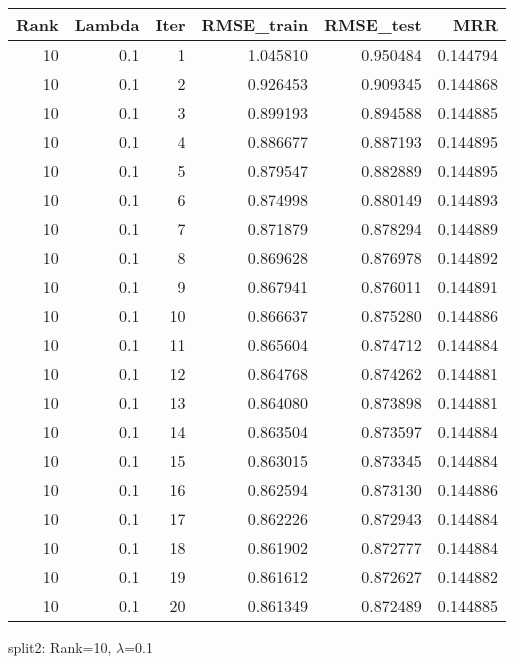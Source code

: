 \begin{tabular}{rrrrrr}
\toprule
 Rank &  Lambda &  Iter &  RMSE\_train &  RMSE\_test &       MRR \\
\midrule
   10 &     0.1 &     1 &    1.045810 &   0.950484 &  0.144794 \\
   10 &     0.1 &     2 &    0.926453 &   0.909345 &  0.144868 \\
   10 &     0.1 &     3 &    0.899193 &   0.894588 &  0.144885 \\
   10 &     0.1 &     4 &    0.886677 &   0.887193 &  0.144895 \\
   10 &     0.1 &     5 &    0.879547 &   0.882889 &  0.144895 \\
   10 &     0.1 &     6 &    0.874998 &   0.880149 &  0.144893 \\
   10 &     0.1 &     7 &    0.871879 &   0.878294 &  0.144889 \\
   10 &     0.1 &     8 &    0.869628 &   0.876978 &  0.144892 \\
   10 &     0.1 &     9 &    0.867941 &   0.876011 &  0.144891 \\
   10 &     0.1 &    10 &    0.866637 &   0.875280 &  0.144886 \\
   10 &     0.1 &    11 &    0.865604 &   0.874712 &  0.144884 \\
   10 &     0.1 &    12 &    0.864768 &   0.874262 &  0.144881 \\
   10 &     0.1 &    13 &    0.864080 &   0.873898 &  0.144881 \\
   10 &     0.1 &    14 &    0.863504 &   0.873597 &  0.144884 \\
   10 &     0.1 &    15 &    0.863015 &   0.873345 &  0.144884 \\
   10 &     0.1 &    16 &    0.862594 &   0.873130 &  0.144886 \\
   10 &     0.1 &    17 &    0.862226 &   0.872943 &  0.144884 \\
   10 &     0.1 &    18 &    0.861902 &   0.872777 &  0.144884 \\
   10 &     0.1 &    19 &    0.861612 &   0.872627 &  0.144882 \\
   10 &     0.1 &    20 &    0.861349 &   0.872489 &  0.144885 \\
\bottomrule
\end{tabular}

\caption{split2: Rank=10, $\lambda$=0.1}
